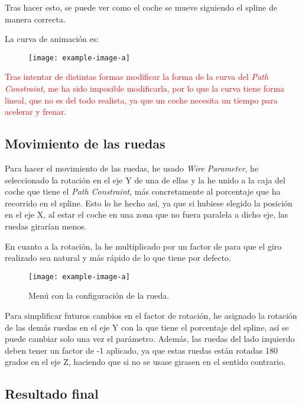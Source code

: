 \bigskip

Tras hacer esto, se puede ver como el coche se mueve siguiendo el spline de manera correcta.

\bigskip

La curva de animación es:

\begin{figure}[H]
    \centering
   \texttt{[image: example-image-a]}
\end{figure}

\textcolor{red}{Tras intentar de distintas formas modificar la forma de la curva del \textit{Path Constraint}, me ha sido imposible modificarla, por lo que la curva tiene forma lineal, que no es del todo realista, ya que un coche necesita un tiempo para acelerar y frenar.} 

\subsection{Movimiento de las ruedas}

Para hacer el movimiento de las ruedas, he usado \textit{Wire Parameter}, he seleccionado la rotación en el eje Y de una de ellas y la he unido a la caja del coche que tiene el \textit{Path Constraint}, más concretamente al porcentaje que ha recorrido en el spline. Esto lo he hecho así, ya que si hubiese elegido la posición en el eje X, al estar el coche en una zona que no fuera paralela a dicho eje, las ruedas girarían menos.

\bigskip

En cuanto a la rotación, la he multiplicado por un factor de \rotFactor para que el giro realizado sea natural y más rápido de lo que tiene por defecto.

\begin{figure}[H]
    \centering
   \texttt{[image: example-image-a]}
   \caption{Menú con la configuración de la rueda.}
\end{figure}

Para simplificar futuros cambios en el factor de rotación, he asignado la rotación de las demás ruedas en el eje Y con la que tiene el porcentaje del spline, así se puede cambiar solo una vez el parámetro. Además, las ruedas del lado izquierdo deben tener un factor de -1 aplicado, ya que estas ruedas están rotadas 180 grados en el eje Z, haciendo que si no se usase girasen en el sentido contrario.

\subsection{Resultado final}

